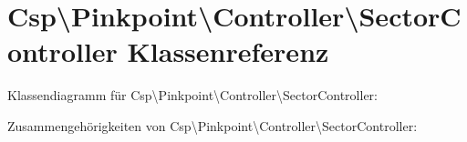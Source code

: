 \hypertarget{classCsp_1_1Pinkpoint_1_1Controller_1_1SectorController}{}\section{Csp\textbackslash{}Pinkpoint\textbackslash{}Controller\textbackslash{}Sector\+Controller Klassenreferenz}
\label{classCsp_1_1Pinkpoint_1_1Controller_1_1SectorController}


Klassendiagramm für Csp\textbackslash{}Pinkpoint\textbackslash{}Controller\textbackslash{}Sector\+Controller\+:


Zusammengehörigkeiten von Csp\textbackslash{}Pinkpoint\textbackslash{}Controller\textbackslash{}Sector\+Controller\+:
